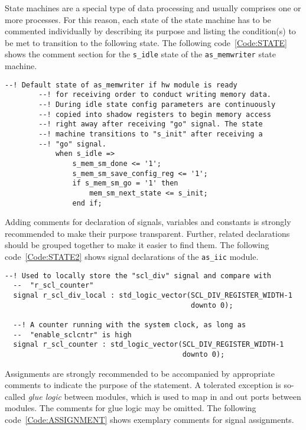 State machines are a special type of data processing and usually comprises one or more processes.
For this reason, each state of the state machine has to be commented individually by describing its purpose and listing the condition(s) to be met to transition to the following state.
The following code~\ref{Code:STATE} shows the comment section for the \texttt{s\_idle} state of the \texttt{as\_memwriter} state machine. 

\begin{lstlisting}[style=hdl, label=Code:STATE, caption=Exemplary comment of a state]
        --! Default state of as_memwriter if hw module is ready 
        --! for receiving order to conduct writing memory data.
        --! During idle state config parameters are continuously 
        --! copied into shadow registers to begin memory access 
        --! right away after receiving "go" signal. The state 
        --! machine transitions to "s_init" after receiving a 
        --! "go" signal.
            when s_idle =>
                s_mem_sm_done <= '1';
                s_mem_sm_save_config_reg <= '1';
                if s_mem_sm_go = '1' then
                    mem_sm_next_state <= s_init;
                end if;
\end{lstlisting}

Adding comments for declaration of signals, variables and constants is strongly recommended to make their purpose transparent.
Further, related declarations should be grouped together to make it easier to find them.
The following code~\ref{Code:STATE2} shows signal declarations of the \texttt{as\_iic} module. 

\begin{lstlisting}[style=hdl, label=Code:STATE2, caption=Exemplary comment for a declaration]
  --! Used to locally store the "scl_div" signal and compare with 
  --  "r_scl_counter"
  signal r_scl_div_local : std_logic_vector(SCL_DIV_REGISTER_WIDTH-1 
                                            downto 0);  
  
  --! A counter running with the system clock, as long as 
  --  "enable_sclcntr" is high
  signal r_scl_counter : std_logic_vector(SCL_DIV_REGISTER_WIDTH-1 
                                          downto 0);
\end{lstlisting}

Assignments are strongly recommended to be accompanied by appropriate comments to indicate the purpose of the statement.
A tolerated exception is so-called \textit{glue logic} between modules, which is used to map in and out ports between modules.
The comments for glue logic may be omitted.
The following code~\ref{Code:ASSIGNMENT} shows exemplary comments for signal assignments. 


